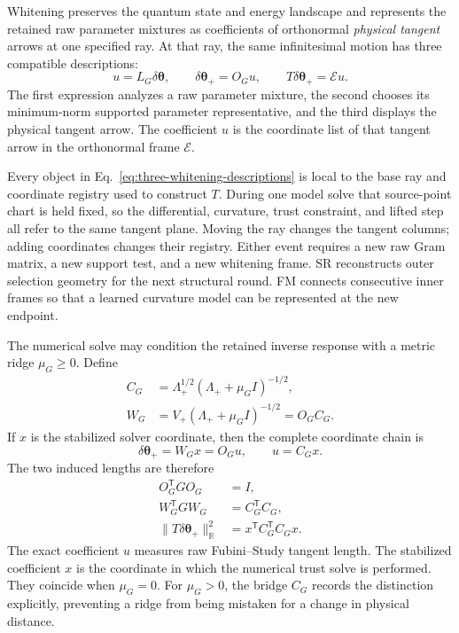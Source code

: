 \documentclass[10pt,twocolumn]{article}
\begin{document}
Whitening preserves the quantum state and energy landscape and represents the
retained raw parameter mixtures as coefficients of orthonormal
\emph{physical tangent} arrows at one specified ray. At that ray, the same
infinitesimal motion has three compatible descriptions:
\begin{equation}
u=L_G\delta\bm\theta,
\qquad
\delta\bm\theta_+=O_Gu,
\qquad
T\delta\bm\theta_+=\mathcal Eu.
\label{eq:three-whitening-descriptions}
\end{equation}
The first expression analyzes a raw parameter mixture, the second chooses its
minimum-norm supported parameter representative, and the third displays the
physical tangent arrow. The coefficient \(u\) is the coordinate list of that
tangent arrow in the orthonormal frame \(\mathcal E\).

Every object in Eq.~\eqref{eq:three-whitening-descriptions} is local to the
base ray and coordinate registry used to construct \(T\). During one model
solve that source-point chart is held fixed, so the differential, curvature,
trust constraint, and lifted step all refer to the same tangent plane. Moving
the ray changes the tangent columns; adding coordinates changes their registry.
Either event requires a new raw Gram matrix, a new support test, and a new
whitening frame. SR reconstructs outer selection geometry for the next
structural round. FM connects consecutive inner frames so that a learned
curvature model can be represented at the new endpoint.

The numerical solve may condition the retained inverse response with a metric
ridge \(\mu_G\geq0\). Define
\begin{align}
C_G&=\Lambda_+^{1/2}(\Lambda_++\mu_GI)^{-1/2},\nonumber\\
W_G&=V_+(\Lambda_++\mu_GI)^{-1/2}=O_GC_G.
\label{eq:three-metric-maps}
\end{align}
If \(x\) is the stabilized solver coordinate, then the complete coordinate
chain is
\begin{equation}
\delta\bm\theta_+=W_Gx=O_Gu,
\qquad
u=C_Gx.
\label{eq:stabilized-coordinate-chain}
\end{equation}
The two induced lengths are therefore
\begin{align}
O_G^{\mathsf T}GO_G&=I,\nonumber\\
W_G^{\mathsf T}GW_G&=C_G^{\mathsf T}C_G,\nonumber\\
\|T\delta\bm\theta_+\|_{\mathbb R}^2
&=x^{\mathsf T}C_G^{\mathsf T}C_Gx.
\label{eq:metric-identities}
\end{align}
The exact coefficient \(u\) measures raw Fubini--Study tangent length. The
stabilized coefficient \(x\) is the coordinate in which the numerical trust
solve is performed. They coincide when \(\mu_G=0\). For \(\mu_G>0\), the
bridge \(C_G\) records the distinction explicitly, preventing a ridge from
being mistaken for a change in physical distance.
\end{document}
